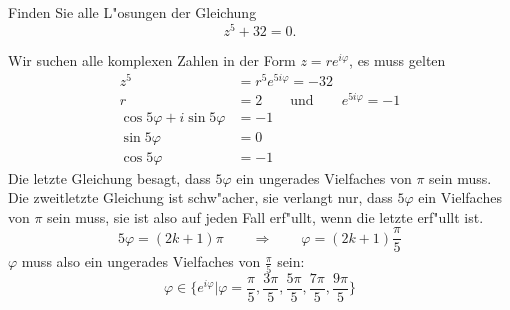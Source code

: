 Finden Sie alle L"osungen der Gleichung
\[
z^5+32=0.
\]

\begin{loesung}
Wir suchen alle komplexen Zahlen in der Form $z=re^{i\varphi}$, es muss gelten
\begin{align*}
z^5&=r^5e^{5i\varphi}=-32
\\
r&=2\qquad\text{und}\qquad e^{5i\varphi}=-1
\\
\cos 5\varphi+i\sin 5\varphi&=-1
\\
\sin 5\varphi&=0
\\
\cos 5\varphi&=-1
\end{align*}
Die letzte Gleichung besagt, dass $5\varphi$ ein ungerades Vielfaches von
$\pi$ sein muss. Die zweitletzte Gleichung ist schw"acher, sie verlangt
nur, dass $5\varphi$ ein Vielfaches von $\pi$ sein muss, sie ist also
auf jeden Fall erf"ullt, wenn die letzte erf"ullt ist.
\[
5\varphi=(2k+1)\pi
\qquad\Rightarrow\qquad
\varphi=(2k+1)\frac{\pi}5
\]
$\varphi$ muss also ein ungerades Vielfaches von $\frac{\pi}5$ sein:
\[
\varphi\in\biggl\{
e^{i\varphi}\bigg|
\varphi
=
\frac{\pi}{5},
\frac{3\pi}{5},
\frac{5\pi}{5},
\frac{7\pi}{5},
\frac{9\pi}{5}
\biggr\}
\]
\end{loesung}

